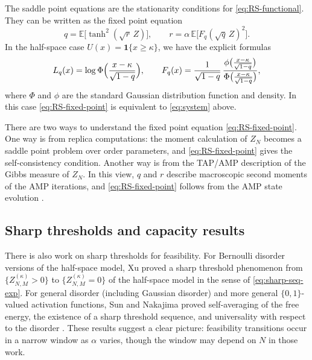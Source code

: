 \documentclass[11pt]{article}
\begin{document}
The saddle point equations are the stationarity conditions for \eqref{eq:RS-functional}. They can be written as the fixed point equation
\begin{equation}\label{eq:RS-fixed-point}
q
=
\mathbb E\bigl[\tanh^2(\sqrt r\,Z)\bigr],
\qquad
r
=
\alpha\,\mathbb E\bigl[F_q(\sqrt q\,Z)^2\bigr].
\end{equation}
In the half-space case $U(x)=\mathbf 1\{x\ge \kappa\}$, we have the explicit formulas
\[
L_q(x)=\log \Phi\Bigl(\frac{x-\kappa}{\sqrt{1-q}}\Bigr),
\qquad
F_q(x)
=
\frac{1}{\sqrt{1-q}}\,
\frac{\phi\bigl(\frac{x-\kappa}{\sqrt{1-q}}\bigr)}{\Phi\bigl(\frac{x-\kappa}{\sqrt{1-q}}\bigr)},
\]
where $\Phi$ and $\phi$ are the standard Gaussian distribution function and density. In this case \eqref{eq:RS-fixed-point} is equivalent to \eqref{eq:system} above.


There are two ways to understand the fixed point equation \eqref{eq:RS-fixed-point}.
One way is from replica computations: the moment calculation of $Z_N$ becomes a saddle point problem over order parameters, and \eqref{eq:RS-fixed-point} gives the self-consistency condition.
Another way is from the TAP/AMP description of the Gibbs measure of $Z_N$. In this view, $q$ and $r$ describe macroscopic second moments of the AMP iterations, and \eqref{eq:RS-fixed-point} follows from the AMP state evolution \cite{DingSun2025,BolthausenNakajimaSunXu2022}.

\subsection{Sharp thresholds and capacity results}

There is also work on sharp thresholds for feasibility.
For Bernoulli disorder versions of the half-space model, Xu proved a sharp threshold phenomenon from $\{Z_{N,M}^{(\kappa)}>0\}$ to $\{Z_{N,M}^{(\kappa)}=0\}$ of the half-space model \cite{Xu2021} in the sense of \eqref{eq:sharp-seq-exp}.
For general disorder (including Gaussian disorder) and more general $\{0,1\}$-valued activation functions, Sun and Nakajima proved self-averaging of the free energy, the existence of a sharp threshold sequence, and universality with respect to the disorder \cite{NakajimaSun2022}.
These results suggest a clear picture: feasibility transitions occur in a narrow window as $\alpha$ varies, though the window may depend on $N$ in those work.
\end{document}
